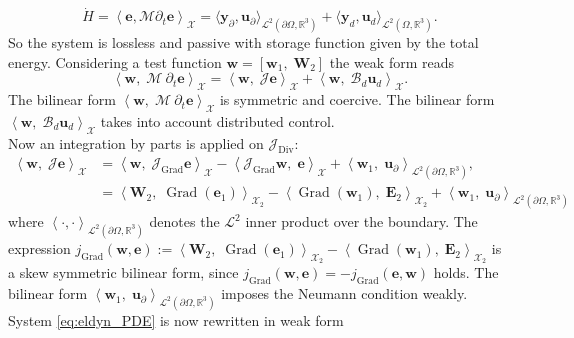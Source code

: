 \documentclass{svjour3}                     %
\DeclareMathOperator*{\Grad}{Grad}
\DeclareMathOperator*{\Div}{Div}
\newcommand{\firstRev}[1]{\textcolor{red!80!black}{#1}}
\begin{document}
\begin{equation}
\label{eq:pow_eldyn}
\dot{H} = \left\langle \bm{e},  \bm{\mathcal{M}} \partial_t \bm{e} \right\rangle_{\mathscr{X}} = \langle \bm{y}_\partial,  \bm{u}_\partial \rangle_{\mathscr{L}^2(\partial\Omega, \mathbb{R}^3)} + \langle \bm{y}_d,  \bm{u}_d \rangle_{\mathscr{L}^2(\Omega, \mathbb{R}^3)}.
\end{equation}
So the system is lossless and passive with storage function given by the total energy. Considering a test function $\bm{w} = [\bm{w}_1, \; \bm{W}_2]$ the weak form reads
\begin{equation*}
\left\langle \bm{w}, \; \bm{\mathcal{M}} \ \partial_t \bm{e} \right\rangle_{\mathscr{X}} = \left\langle \bm{w}, \; \bm{\mathcal{J}} \bm{e} \right\rangle_{\mathscr{X}} + \left\langle \bm{w}, \; \bm{\mathcal{B}}_d \bm{u}_d \right\rangle_{\mathscr{X}}.
\end{equation*}
The bilinear form $\left\langle \bm{w}, \; \bm{\mathcal{M}} \ \partial_t \bm{e} \right\rangle_{\mathscr{X}}$ is symmetric and coercive. The bilinear form $\left\langle \bm{w}, \; \bm{\mathcal{B}}_d \bm{u}_d \right\rangle_{\mathscr{X}}$ takes into account distributed control.\\
Now an integration by parts is applied on $\bm{\mathcal{J}}_{\Div}$:
\firstRev{
\begin{equation}
\begin{aligned}
\left\langle \bm{w}, \; \bm{\mathcal{J}} \bm{e} \right\rangle_{\mathscr{X}} &= \left\langle \bm{w}, \; \bm{\mathcal{J}}_{\Grad} \bm{e} \right\rangle_{\mathscr{X}} - \left\langle \bm{\mathcal{J}}_{\Grad} \bm{w}, \; \bm{e} \right\rangle_{\mathscr{X}} + \left\langle \bm{w}_1, \; \bm{u}_\partial \right\rangle_{\mathscr{L}^2(\partial \Omega, \mathbb{R}^3)}, \\
&= \left\langle \bm{W}_2, \; \Grad(\bm{e}_1) \right\rangle_{\mathscr{X}_2} - \left\langle {\Grad} (\bm{w}_1), \; \bm{E}_2 \right\rangle_{\mathscr{X}_2} + \left\langle \bm{w}_1, \; \bm{u}_\partial \right\rangle_{\mathscr{L}^2(\partial \Omega, \mathbb{R}^3)}
\end{aligned}
\end{equation}
}
where $\left\langle \cdot,  \cdot \right\rangle_{\mathscr{L}^2(\partial \Omega, \mathbb{R}^3)}$ denotes the $\mathscr{L}^2$ inner product over the boundary. The expression $j_{\Grad}(\bm{w}, \bm{e}) :=\left\langle \bm{W}_2, \; \Grad(\bm{e}_1) \right\rangle_{\mathscr{X}_2} - \left\langle {\Grad} (\bm{w}_1), \; \bm{E}_2 \right\rangle_{\mathscr{X}_2}$ is a skew symmetric bilinear form, since $j_{\Grad}(\bm{w}, \bm{e})=-j_{\Grad}(\bm{e},\bm{w})$ holds. The bilinear form $\left\langle \bm{w}_1, \; \bm{u}_\partial \right\rangle_{\mathscr{L}^2(\partial \Omega, \mathbb{R}^3)}$ imposes the Neumann condition weakly. System \eqref{eq:eldyn_PDE} is now rewritten in weak form
\end{document}
